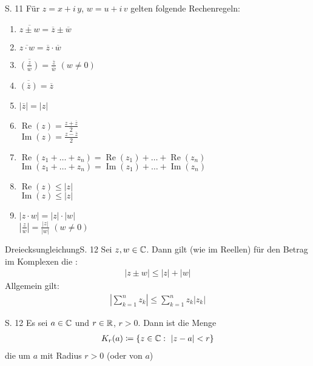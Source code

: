 \begin{satz}[Rechenregeln]{S. 11}
  Für $z = x + i \, y$, $w = u + i \, v$ gelten folgende Rechenregeln:
  \begin{enumerate}
    \item $\displaystyle \overline{z \pm w} = \overline{z} \pm \overline{w}$
    \item $\displaystyle \overline{z \cdot w} = \overline{z} \cdot \overline{w}$
    \item $\displaystyle \overline{\left( \frac{z}{w} \right)} = \frac{\overline{z}}{\overline{w}}$ $(w \neq 0)$
    \item $\displaystyle \overline{\left( \overline{z} \right)} = \overline{z}$
    \item $\displaystyle \left| \overline{z} \right| = \left| z \right|$
    \item $\displaystyle \operatorname{Re}(z) = \frac{z + \overline{z}}{2}$\\
      $\displaystyle \operatorname{Im}(z) = \frac{z - \overline{z}}{2}$
    \item $\displaystyle \operatorname{Re}(z_1 + \dots + z_n) = \operatorname{Re}(z_1) + \dots + \operatorname{Re}(z_n)$\\
      $\displaystyle \operatorname{Im}(z_1 + \dots + z_n) = \operatorname{Im}(z_1) + \dots + \operatorname{Im}(z_n)$
    \item $\displaystyle \operatorname{Re}(z) \leq |z|$\\
      $\displaystyle \operatorname{Im}(z) \leq |z|$
    \item $\displaystyle | z \cdot w | = |z| \cdot |w|$\\
      $\displaystyle \left| \frac{z}{w} \right| = \frac{|z|}{|w|}$ $(w \neq 0)$
  \end{enumerate}
\end{satz}

\begin{bemerkung}{Dreiecksungleichung}{S. 12}
  Sei $z, w \in \mathbb{C}$.
  Dann gilt (wie im Reellen) für den Betrag im Komplexen die :
  \begin{align}
    | z \pm w | \leq |z| + |w|
  \end{align}
  Allgemein gilt:
  \begin{align}
    \left| \sum_{k=1}^n z_k \right| \leq \sum_{k=1}^n z_k \left| z_k \right|
  \end{align}
\end{bemerkung}

\begin{definition}{S. 12}
  Es sei $a \in \mathbb{C}$ und $r \in \mathbb{R}$, $r > 0$.
  Dann ist die Menge
  \begin{align}
    K_r (a) \coloneqq \{ z \in \mathbb{C} : \ |z-a| < r \}
  \end{align}
  die  um $a$ mit Radius $r>0$ (oder  von $a$)
\end{definition}

